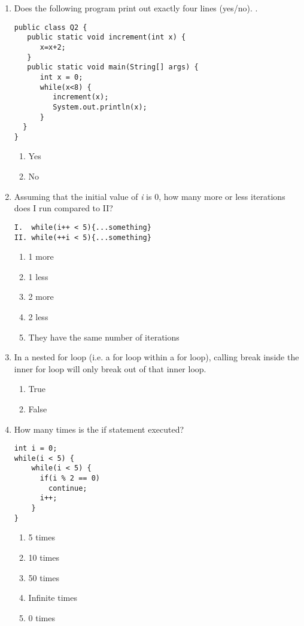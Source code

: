 \documentclass[CS180-S16-FinalExam.tex]{subfiles}
\begin{document}
\begin{enumerate}
\item Does the following program print out exactly four lines (yes/no).  .
\begin{lstlisting}
public class Q2 {
   public static void increment(int x) {
      x=x+2;
   }
   public static void main(String[] args) {
      int x = 0;
      while(x<8) {
         increment(x);
         System.out.println(x);
      }
  }
}
\end{lstlisting}
\begin{enumerate}
\item Yes
\item No \ifdraft \Ans \fi
\end{enumerate}

\item Assuming that the initial value of \textit{i} is 0, how many more or less iterations does I run compared to II?
\begin{lstlisting}
I.  while(i++ < 5){...something}
II. while(++i < 5){...something}
\end{lstlisting}

\begin{enumerate}
\item 1 more \ifdraft \Ans \fi
\item 1 less
\item 2 more
\item 2 less
\item They have the same number of iterations
\end{enumerate}

\item In a nested for loop (i.e. a for loop within a for loop), calling break inside the inner for loop will only break out of that inner loop. 

\begin{enumerate}
\item True \ifdraft \Ans \fi
\item False
\end{enumerate}

\item How many times is the if statement executed?
\begin{lstlisting}
int i = 0;
while(i < 5) {
	while(i < 5) {
      if(i % 2 == 0)
        continue;
      i++;
	}
}
\end{lstlisting}

\begin{enumerate}
\item 5 times
\item 10 times
\item 50 times
\item Infinite times \ifdraft \Ans \fi
\item 0 times
\end{enumerate}


\end{enumerate}
\end{document}
